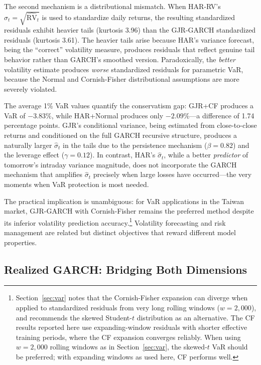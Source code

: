 The second mechanism is a distributional mismatch. When HAR-RV's $\hat{\sigma}_t = \sqrt{\widehat{\text{RV}}_t}$ is used to standardize daily returns, the resulting standardized residuals exhibit heavier tails (kurtosis 3.96) than the GJR-GARCH standardized residuals (kurtosis 3.61). The heavier tails arise because HAR's variance forecast, being the ``correct'' volatility measure, produces residuals that reflect genuine tail behavior rather than GARCH's smoothed version. Paradoxically, the \textit{better} volatility estimate produces \textit{worse} standardized residuals for parametric VaR, because the Normal and Cornish-Fisher distributional assumptions are more severely violated.

The average 1\% VaR values quantify the conservatism gap: GJR+CF produces a VaR of $-3.83\%$, while HAR+Normal produces only $-2.09\%$---a difference of 1.74 percentage points. GJR's conditional variance, being estimated from close-to-close returns and conditioned on the full GARCH recursive structure, produces a naturally larger $\hat{\sigma}_t$ in the tails due to the persistence mechanism ($\beta = 0.82$) and the leverage effect ($\gamma = 0.12$). In contrast, HAR's $\hat{\sigma}_t$, while a better \textit{predictor} of tomorrow's intraday variance magnitude, does not incorporate the GARCH mechanism that amplifies $\hat{\sigma}_t$ precisely when large losses have occurred---the very moments when VaR protection is most needed.

The practical implication is unambiguous: for VaR applications in the Taiwan market, GJR-GARCH with Cornish-Fisher remains the preferred method despite its inferior volatility prediction accuracy.\footnote{Section~\ref{sec:var} notes that the Cornish-Fisher expansion can diverge when applied to standardized residuals from very long rolling windows ($w = 2{,}000$), and recommends the skewed Student-$t$ distribution as an alternative. The CF results reported here use expanding-window residuals with shorter effective training periods, where the CF expansion converges reliably. When using $w = 2{,}000$ rolling windows as in Section~\ref{sec:var}, the skewed-$t$ VaR should be preferred; with expanding windows as used here, CF performs well.} Volatility forecasting and risk management are related but distinct objectives that reward different model properties.


\subsection{Realized GARCH: Bridging Both Dimensions}
\label{sec:hf_realgarch}

